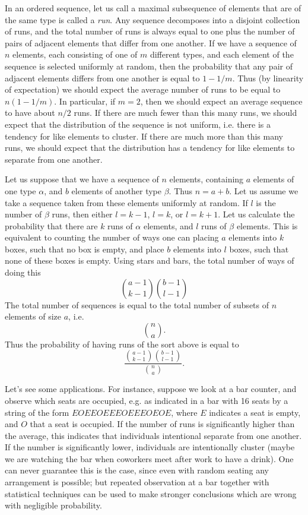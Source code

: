 \begin{example}
    In an ordered sequence, let us call a maximal subsequence of elements that are of the same type is called a \emph{run}. Any sequence decomposes into a disjoint collection of runs, and the total number of runs is always equal to one plus the number of pairs of adjacent elements that differ from one another. If we have a sequence of $n$ elements, each consisting of one of $m$ different types, and each element of the sequence is selected uniformly at random, then the probability that any pair of adjacent elements differs from one another is equal to $1 - 1/m$. Thus (by linearity of expectation) we should expect the average number of runs to be equal to $n(1 - 1/m)$. In particular, if $m = 2$, then we should expect an average sequence to have about $n/2$ runs. If there are much fewer than this many runs, we should expect that the distribution of the sequence is not uniform, i.e. there is a tendency for like elements to cluster. If there are much more than this many runs, we should expect that the distribution has a tendency for like elements to separate from one another.

    Let us suppose that we have a sequence of $n$ elements, containing $a$ elements of one type $\alpha$, and $b$ elements of another type $\beta$. Thus $n = a + b$. Let us assume we take a sequence taken from these elements uniformly at random. If $l$ is the number of $\beta$ runs, then either $l = k-1$, $l = k$, or $l = k+1$. Let us calculate the probability that there are $k$ runs of $\alpha$ elements, and $l$ runs of $\beta$ elements. This is equivalent to counting the number of ways one can placing $a$ elements into $k$ boxes, such that no box is empty, and place $b$ elements into $l$ boxes, such that none of these boxes is empty. Using stars and bars, the total number of ways of doing this
    \[ {{a-1} \choose {k - 1}} {{b-1} \choose {l-1}} \]
    The total number of sequences is equal to the total number of subsets of $n$ elements of size $a$, i.e.
    \[ {{n} \choose {a}}. \]
    Thus the probability of having runs of the sort above is equal to
    \[ \frac{{{a-1} \choose {k - 1}} {{b-1} \choose {l-1}}}{{{n} \choose {a}}}. \]

    Let's see some applications. For instance, suppose we look at a bar counter, and observe which seats are occupied, e.g. as indicated in a bar with 16 seats by a string of the form $EOEEOEEEOEEEOEOE$, where $E$ indicates a seat is empty, and $O$ that a seat is occupied. If the number of runs is significantly higher than the average, this indicates that individuals intentional separate from one another. If the number is significantly lower, individuals are intentionally cluster (maybe we are watching the bar when coworkers meet after work to have a drink). One can never guarantee this is the case, since even with random seating any arrangement is possible; but repeated observation at a bar together with statistical techniques can be used to make stronger conclusions which are wrong with negligible probability.


\end{example}
